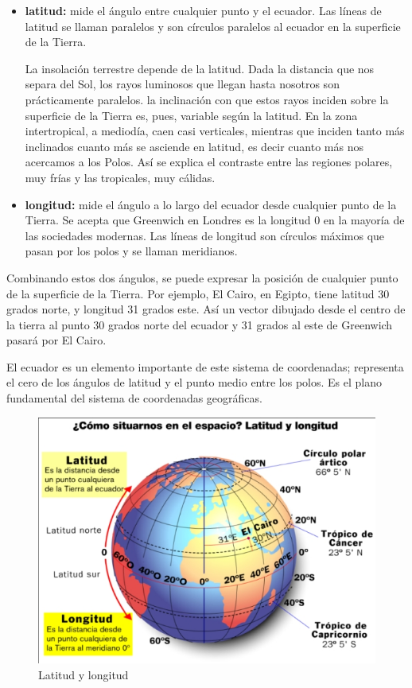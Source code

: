 \documentclass[a4paper,12pt,twoside]{article}
\begin{document}
\begin{itemize}
\item {\bf\Gls{latitud}:} mide el \'angulo entre cualquier punto y el ecuador. Las
  l\'ineas de latitud se llaman paralelos y son c\'irculos paralelos al
  ecuador en la superficie de la Tierra.

  La insolaci\'on terrestre depende de la latitud. Dada la distancia que
  nos separa del Sol, los rayos luminosos que llegan hasta nosotros
  son pr\'acticamente paralelos. la inclinaci\'on con que estos rayos
  inciden sobre la superficie de la Tierra es, pues, variable seg\'un la
  latitud. En la zona intertropical, a mediod\'ia, caen casi verticales,
  mientras que inciden tanto m\'as inclinados cuanto m\'as se asciende en
  latitud, es decir cuanto m\'as nos acercamos a los Polos. As\'i se
  explica el contraste entre las regiones polares, muy fr\'ias y las
  tropicales, muy c\'alidas.


\item {\bf \Gls{longitud}:} mide el \'angulo a lo largo del ecuador desde cualquier   punto de la Tierra. Se acepta que Greenwich en Londres es la
  longitud 0 en la mayor\'ia de las sociedades modernas. Las l\'ineas de
  longitud son c\'irculos m\'aximos que pasan por los polos y se llaman
  meridianos.
\end{itemize}


Combinando estos dos \'angulos, se puede expresar la posici\'on de cualquier punto de la superficie de la Tierra. Por ejemplo, El Cairo, en Egipto, tiene latitud 30 grados norte, y longitud 31 grados este. As\'i un vector dibujado desde el centro de la tierra al punto 30 grados norte del ecuador y 31 grados al este de Greenwich pasar\'a por El Cairo.

El ecuador es un elemento importante de este sistema de coordenadas; representa el cero de los \'angulos de latitud y el punto medio entre los polos. Es el plano fundamental del sistema de coordenadas geogr\'aficas.

\begin{figure}[!h]
  \centering
  \includegraphics[width=\textwidth]{./Imagenes/latitud_longitud.jpg}
  \caption{Latitud y longitud}
  \label{fig:latitud-longitud}
\end{figure}
\end{document}
